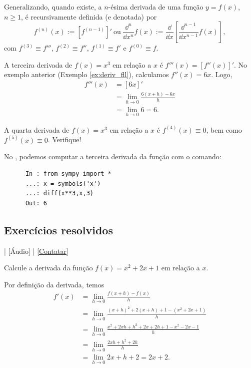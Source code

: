 Generalizando, quando existe, a $n$-ésima derivada de uma função $y = f(x)$, $n\geq 1$, é recursivamente definida (e denotada) por
\begin{equation}
  f^{(n)}(x) := [f^{(n-1)}]' ~ \text{ou} ~ \frac{\dd^n}{\dd x^n}f(x) := \frac{\dd}{\dd x}\left[\frac{\dd^{n-1}}{\dd x^{n-1}}f(x)\right],
\end{equation}
com $f^{(3)}\equiv f'''$, $f^{(2)}\equiv f''$, $f^{(1)}\equiv f'$ e $f^{(0)}\equiv f$.

\begin{ex}
  A terceira derivada de $f(x) = x^3$ em relação a $x$ é $f'''(x) = [f''(x)]'$. No exemplo anterior (Exemplo \ref{ex:deriv_fll}), calculamos $f''(x) = 6x$. Logo,
    \begin{align}
      f'''(x) &= [6x]' \\
              &= \lim_{h\to 0} \frac{6(x+h)-6x}{h} \\
              &= \lim_{h\to 0} 6 = 6.
    \end{align}

    A quarta derivada de $f(x) = x^3$ em relação a $x$ é $f^{(4)}(x) \equiv 0$, bem como $f^{(5)}(x) \equiv 0$. Verifique!

    \ifispython
    No \sympy, podemos computar a terceira derivada da função com o comando:
    \begin{lstlisting}
      In : from sympy import *
      ...: x = symbols('x')
      ...: diff(x**3,x,3)
      Out: 6
    \end{lstlisting}
  \fi  
\end{ex}


\subsection*{Exercícios resolvidos}

\begin{flushright}
  [Vídeo] | [Áudio] | \href{https://phkonzen.github.io/notas/contato.html}{[Contatar]}
\end{flushright}

\begin{exeresol}
  Calcule a derivada da função $f(x) = x^2 + 2x + 1$ em relação a $x$.
\end{exeresol}
\begin{resol}
  Por definição da derivada, temos
  \begin{align}
    f'(x) &= \lim_{h\to 0} \frac{f(x+h)-f(x)}{h}\\
          &= \lim_{h\to 0} \frac{(x+h)^2 + 2(x+h) + 1 - (x^2+2x+1)}{h}\\
          &= \lim_{h\to 0} \frac{x^2+2xh+h^2+2x+2h+1-x^2-2x-1}{h}\\
          &= \lim_{h\to 0} \frac{2xh+h^2+2h}{h}\\
          &= \lim_{h\to 0} 2x+h+2 = 2x+2.
  \end{align}
\end{resol}

